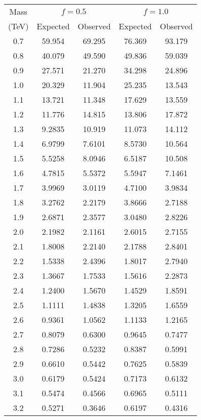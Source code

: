 \begin{table}[h!]
\begin{center}
\begin{tabular}{c||cc||cc}
\hline
Mass     & \multicolumn{2}{c||}{$f=0.5$} & \multicolumn{2}{c}{$f=1.0$} \\
(\unit{TeV}) & Expected  & Observed & Expected & Observed  \\
\hline
\hline
0.7 & 59.954  & 69.295 &  76.369 &  93.179 \\
0.8 & 40.079  & 49.590 &  49.836 &  59.039 \\
0.9 & 27.571  & 21.270 &  34.298 &  24.896 \\
1.0 & 20.329  & 11.904 &  25.235 &  13.543 \\
1.1 & 13.721  & 11.348 &  17.629 &  13.559 \\
1.2 & 11.776  & 14.815 &  13.806 &  17.872 \\
1.3 & 9.2835  & 10.919 &  11.073 &  14.112 \\
1.4 & 6.9799  & 7.6101 &  8.5730 &  10.564 \\
1.5 & 5.5258  & 8.0946 &  6.5187 &  10.508 \\
1.6 & 4.7815  & 5.5372 &  5.5947 &  7.1461 \\
1.7 & 3.9969  & 3.0119 &  4.7100 &  3.9834 \\
1.8 & 3.2762  & 2.2179 &  3.8666 &  2.7188 \\
1.9 & 2.6871  & 2.3577 &  3.0480 &  2.8226 \\
2.0 & 2.1982  & 2.1161 &  2.6015 &  2.7155 \\
2.1 & 1.8008  & 2.2140 &  2.1788 &  2.8401 \\
2.2 & 1.5338  & 2.4396 &  1.8017 &  2.7940 \\
2.3 & 1.3667  & 1.7533 &  1.5616 &  2.2873 \\
2.4 & 1.2400  & 1.5670 &  1.4529 &  1.8591 \\
2.5 & 1.1111  & 1.4838 &  1.3205 &  1.6559 \\
2.6 & 0.9361  & 1.0562 &  1.1133 &  1.2165 \\
2.7 & 0.8079  & 0.6300 &  0.9645 &  0.7477 \\
2.8 & 0.7286  & 0.5232 &  0.8387 &  0.5991 \\
2.9 & 0.6610  & 0.5442 &  0.7625 &  0.5839 \\
3.0 & 0.6179  & 0.5424 &  0.7173 &  0.6132 \\
3.1 & 0.5474  & 0.4566 &  0.6965 &  0.5111 \\
3.2 & 0.5271  & 0.3646 &  0.6197 &  0.4316 \\

\end{tabular}
\end{center}
\end{table}
